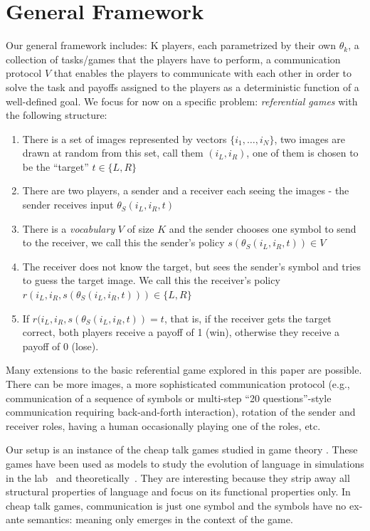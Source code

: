 \section{General Framework}
\label{sec:general-framework}

Our general framework includes: K players, each parametrized by their own $\theta_k$, a collection of tasks/games that the players have to perform, a communication protocol $V$ that enables the players to communicate with each other in order to solve the task and payoffs assigned to the players as a deterministic function of a well-defined goal. We focus for now on a specific problem: \textit{referential games} with the following structure:

\begin{enumerate}
\item There is a set of images represented by vectors $\lbrace i_1, \dots, i_N \rbrace$, two images are drawn at random from this set, call them $(i_L, i_R)$, one of them is chosen to be the ``target'' $t \in \lbrace L, R \rbrace$
\item There are two players, a sender and a receiver each seeing the images - the sender receives input $\theta_S (i_L, i_R, t)$
\item There is a \textit{vocabulary} $V$ of size $K$ and the sender chooses one symbol to send to the receiver, we call this the sender's policy $s(\theta_S (i_L, i_R, t))\in V$
\item The receiver does not know the target, but sees the sender's symbol and tries to guess the target image. We call this the receiver's policy $r(i_L, i_R, s(\theta_S (i_L, i_R, t))) \in \lbrace L, R \rbrace$ 
\item If $r(i_L, i_R, s(\theta_S (i_L, i_R, t)) = t$, that is, if the receiver gets the target correct, both players receive a payoff of 1 (win), otherwise they receive a payoff of 0 (lose).
\end{enumerate}

Many extensions to the basic referential game explored in this paper are possible. There can be more images, a more sophisticated communication protocol (e.g., communication of a sequence of symbols or multi-step ``20 questions''-style communication requiring back-and-forth interaction),  rotation of the sender and receiver roles, having a human occasionally playing one of the roles, etc. 

Our setup is an instance of the cheap talk games studied in game theory%
. These games have been used as models to study the evolution of language in simulations in the lab~\citep{crawford1998survey,blume:1998experimental} and theoretically~\cite{crawford1982strategic}. They are interesting because they strip away all structural properties of language and focus on  its functional properties only. In cheap talk games, communication is just one symbol and the symbols have no ex-ante semantics: meaning only emerges in the context of the game.

